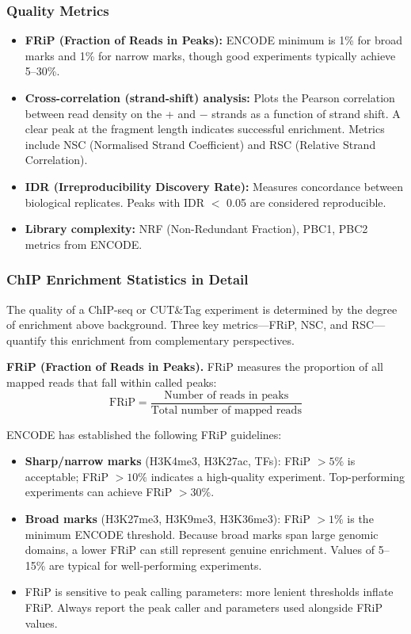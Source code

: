 \subsubsection{Quality Metrics}

\begin{itemize}[itemsep=2pt]
  \item \textbf{FRiP (Fraction of Reads in Peaks):} ENCODE minimum is 1\% for broad marks and 1\% for narrow marks, though good experiments typically achieve 5--30\%.
  \item \textbf{Cross-correlation (strand-shift) analysis:} Plots the Pearson correlation between read density on the + and $-$ strands as a function of strand shift. A clear peak at the fragment length indicates successful enrichment. Metrics include NSC (Normalised Strand Coefficient) and RSC (Relative Strand Correlation).
  \item \textbf{IDR (Irreproducibility Discovery Rate):} Measures concordance between biological replicates. Peaks with IDR $<$ 0.05 are considered reproducible.
  \item \textbf{Library complexity:} NRF (Non-Redundant Fraction), PBC1, PBC2 metrics from ENCODE.
\end{itemize}

\subsubsection{ChIP Enrichment Statistics in Detail}
\label{subsubsec:histones:enrichment-stats}

The quality of a ChIP-seq or CUT\&Tag experiment is determined by the degree of enrichment above background. Three key metrics---FRiP, NSC, and RSC---quantify this enrichment from complementary perspectives.

\textbf{FRiP (Fraction of Reads in Peaks).} FRiP measures the proportion of all mapped reads that fall within called peaks:
\begin{equation}
\label{eq:histones:frip}
\text{FRiP} = \frac{\text{Number of reads in peaks}}{\text{Total number of mapped reads}}
\end{equation}

ENCODE has established the following FRiP guidelines:
\begin{itemize}[itemsep=2pt]
  \item \textbf{Sharp/narrow marks} (H3K4me3, H3K27ac, TFs): FRiP $> 5\%$ is acceptable; FRiP $> 10\%$ indicates a high-quality experiment. Top-performing experiments can achieve FRiP $> 30\%$.
  \item \textbf{Broad marks} (H3K27me3, H3K9me3, H3K36me3): FRiP $> 1\%$ is the minimum ENCODE threshold. Because broad marks span large genomic domains, a lower FRiP can still represent genuine enrichment. Values of 5--15\% are typical for well-performing experiments.
  \item FRiP is sensitive to peak calling parameters: more lenient thresholds inflate FRiP. Always report the peak caller and parameters used alongside FRiP values.
\end{itemize}

